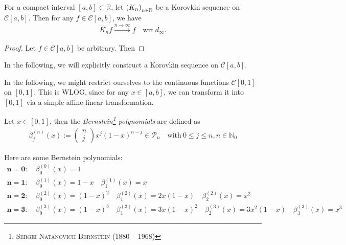\begin{theorem}[Korovkin, 1953]\label{thrm:korovkin_1953}
	For a compact interval $[a, b]\subset \mathbb R$, let $\seq[K_n]$ be a Korovkin sequence on $\mathcal C[a, b]$. Then for any $f\in\mathcal C[a, b]$, we have
	\begin{align}
		K_nf \overset{n\to\infty}{\longrightarrow} f \quad \text{wrt}\ d_{\infty}.
	\end{align}
\end{theorem}

\begin{proof}
	Let $f\in\mathcal C[a, b]$ be arbitrary. Then 
\end{proof}

In the following, we will explicitly construct a Korovkin sequence on $\mathcal C[a, b]$.

\begin{remark}
	In the following, we might restrict ourselves to the continuous functions $\mathcal C[0, 1]$ on $[0, 1]$. This is WLOG, since for any $x\in [a, b]$, we can transform it into $[0, 1]$ via a simple affine-linear transformation.
\end{remark}

\begin{defn}\label{defn:Bernstein-polynomials}
	Let $x\in[0, 1]$, then the \textit{Bernstein\footnote{\textsc{Sergei Natanovich Bernstein} (1880 -- 1968)} polynomials} are defined as
	\begin{align}
		\beta_{j}^{(n)}(x) := \begin{pmatrix}
			n \\ j
		\end{pmatrix} x^j (1 - x)^{n-j} \in\mathcal P_n \quad \text{with}\ 0\leq j\leq n, n\in \mathbb N_{0}
	\end{align}
\end{defn}

\begin{exmp}
	Here are some Bernstein polynomials:
	\begin{gather*}
		\bm{n = 0}: \quad \beta_{0}^{(0)}(x) = 1
		\\[6pt]
		\bm{n = 1}: \quad \beta_{0}^{(1)}(x) = 1 - x \quad \beta_{1}^{(1)}(x) = x
		\\[6pt]
		\bm{n = 2}: \quad \beta_{0}^{(2)}(x) = (1 - x)^2 \quad \beta_{1}^{(2)}(x) = 2x(1 - x) \quad \beta_{2}^{(2)}(x) = x^2
		\\[6pt]
		\bm{n = 3}: \quad \beta_{0}^{(3)}(x) = (1-x)^3 \quad \beta_{1}^{(3)}(x) = 3x(1-x)^2 \quad \beta_{2}^{(3)}(x) = 3x^2(1-x) \quad \beta_{3}^{(3)}(x) = x^3
	\end{gather*} 
\end{exmp}


